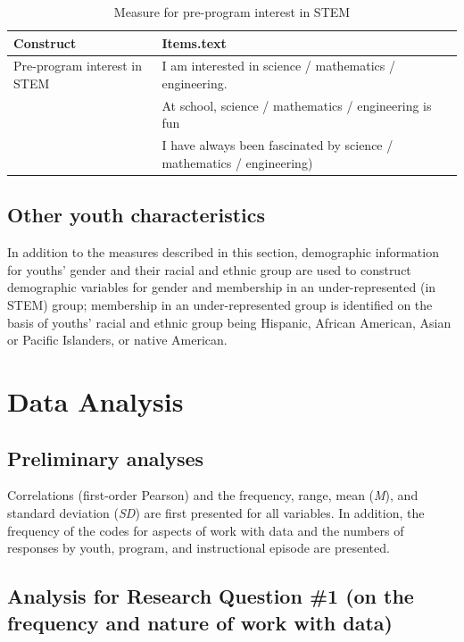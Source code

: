 \documentclass[]{msu-thesis}
\theoremstyle{definition}
\theoremstyle{definition}
\theoremstyle{definition}
\theoremstyle{remark}
\begin{document}
\begin{table}

\caption{\label{tab:unnamed-chunk-6}Measure for pre-program interest in STEM}
\centering
\begin{tabular}[t]{ll}
\toprule
Construct & Items.text\\
\midrule
Pre-program interest in STEM & I am interested in science / mathematics / engineering.\\
 & At school, science / mathematics / engineering is fun\\
 & I have always been fascinated by science / mathematics / engineering)\\
\bottomrule
\end{tabular}
\end{table}

\subsection{Other youth
characteristics}\label{other-youth-characteristics}

In addition to the measures described in this section, demographic
information for youths' gender and their racial and ethnic group are
used to construct demographic variables for gender and membership in an
under-represented (in STEM) group; membership in an under-represented
group is identified on the basis of youths' racial and ethnic group
being Hispanic, African American, Asian or Pacific Islanders, or native
American.

\section{Data Analysis}\label{data-analysis}

\subsection{Preliminary analyses}\label{preliminary-analyses}

Correlations (first-order Pearson) and the frequency, range, mean
(\emph{M}), and standard deviation (\emph{SD}) are first presented for
all variables. In addition, the frequency of the codes for aspects of
work with data and the numbers of responses by youth, program, and
instructional episode are presented.

\subsection{Analysis for Research Question \#1 (on the frequency and
nature of work with
data)}\label{analysis-for-research-question-1-on-the-frequency-and-nature-of-work-with-data}
\end{document}
